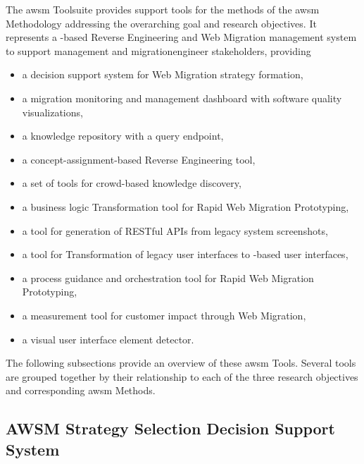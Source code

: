 The \gls{awsm} Toolsuite provides support tools for the methods of the \gls{awsm} Methodology addressing the overarching goal and research objectives.
It represents a -based \gls{Reverse Engineering} and \gls{Web Migration} management system to support management and \gls{migrationengineer} stakeholders, providing 
\begin{itemize}
\item a decision support system for Web Migration strategy formation,
\item a migration monitoring and management dashboard with software quality visualizations,
\item a  knowledge repository with a query endpoint,
\item a concept-assignment-based \gls{Reverse Engineering} tool,
\item a set of tools for crowd-based knowledge discovery,
\item a business logic \gls{Transformation} tool for \gls{Rapid Web Migration Prototyping},
\item a tool for generation of RESTful APIs from legacy system screenshots,
\item a tool for \gls{Transformation} of legacy user interfaces to -based user interfaces,
\item a process guidance and orchestration tool for \gls{Rapid Web Migration Prototyping}, 
\item a measurement tool for customer impact through \gls{Web Migration}, 
\item a visual user interface element detector.
\end{itemize}

The following subsections provide an overview of these \gls{awsm} Tools.
Several tools are grouped together by their relationship to each of the three research objectives and corresponding \gls{awsm} Methods.

\vspace{-15pt}
\hypertarget{sec:s2dcs}{%
\subsection[AWSM Strategy Selection Decision Support Syst.]{AWSM Strategy Selection Decision Support System}\label{sec:s2dcs}}
\vspace{15pt}

